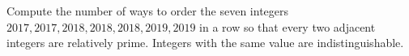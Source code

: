 Compute the number of ways to order the seven integers $2017, 2017, 2018, 2018, 2018, 2019, 2019$ in a row so that every two adjacent integers are relatively prime. Integers with the same value are indistinguishable.
